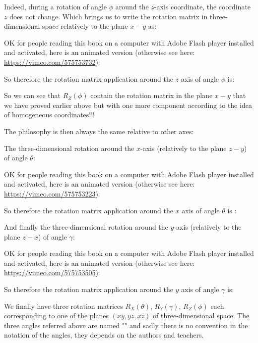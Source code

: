	Indeed, during a rotation of angle $\phi$ around the $z$-axis coordinate, the coordinate $z$ does not change. Which brings us to write the rotation matrix in three-dimensional space relatively to the plane $x-y$ as:
	
	OK for people reading this book on a computer with Adobe Flash player installed and activated, here is an animated version (otherwise see here: \url{https://vimeo.com/575753732}):
	\begin{center}
	\centering
	\end{center}
	So therefore the rotation matrix application around the $z$ axis of angle $\phi$ is:
		
	 So we can see that $R_Z(\phi)$ contain the rotation matrix in the plane $x-y$ that we have proved earlier above but with one more component according to the idea of homogeneous coordinates!!!
	 
	 The philosophy is then always the same relative to other axes:
	 
	 The three-dimensional rotation around the $x$-axis (relatively to the plane $z-y$) of angle $\theta$:
	
	OK for people reading this book on a computer with Adobe Flash player installed and activated, here is an animated version (otherwise see here: \url{https://vimeo.com/575753223}):
	\begin{center}
	\centering
	\end{center}
	So therefore the rotation matrix application around the $x$ axis of angle $\theta$ is \label{3d rotation matrix around x}:
	
	 
	 And finally the three-dimensional rotation around the $y$-axis (relatively to the plane $z-x$) of angle $\gamma$:
	
	OK for people reading this book on a computer with Adobe Flash player installed and activated, here is an animated version (otherwise see here: \url{https://vimeo.com/575753505}):
	\begin{center}
	\centering
	\end{center}
	So therefore the rotation matrix application around the $y$ axis of angle $\gamma$ is:
	
	 We finally have three rotation matrices $R_X(\theta)$, $R_Y(\gamma)$, $R_Z(\phi)$ each corresponding to one of the planes $(xy,yz,xz)$ of three-dimensional space. The three angles referred above are named "" and sadly there is no convention in the notation of the angles, they depends on the authors and teachers.

